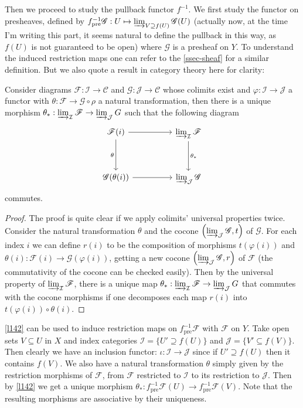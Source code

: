 \documentclass[12pt,letter]{article}
\begin{document}
	Then we proceed to study the pullback functor $f^{-1}$. We first study the functor on presheaves, defined by $f_{\text{pre}}^{-1}\mathscr G:U\mapsto \varinjlim_{V\supseteq f(U)}\mathscr G(U)$ (actually now, at the time I'm writing this part, it seems natural to define the pullback in this way, as $f(U)$ is not guaranteed to be open) where $\mathscr G$ is a presheaf on $Y$. To understand the induced restriction maps one can refer to the \autoref{ssec-sheaf} for a similar definition. But we also quote a result in category theory here for clarity:
	\begin{lemma}\label{l142}
		Consider diagrams $\mathscr F:\mathcal I\to \mathcal C$ and $\mathscr G:\mathcal J\to \mathcal C$ whose colimits exist and $\varphi:\mathcal I\to\mathcal J$ a functor with $\theta:\mathscr F\to \mathscr G\circ\rho$ a natural transformation, then there is a unique morphism $\theta_*:\varinjlim_{\mathcal I} \mathscr F\to\varinjlim_{\mathcal J}G$ such that the following diagram
		\[
			\begin{tikzcd}
				\mathscr F(i) \arrow[rr] \arrow[dd, "\theta"'] &  & \varinjlim_{\mathcal I}\mathscr F \arrow[dd, "\theta_*"] \\
															   &  &                                                          \\
				\mathscr{G}(\theta(i)) \arrow[rr]              &  & \varinjlim_{\mathcal J}\mathscr G                       
				\end{tikzcd}	
		\]
		commutes.
	\end{lemma}
	\begin{proof}
		The proof is quite clear if we apply colimits' universal properties twice. Consider the natural transformation $\theta$ and the cocone $\left(\varinjlim_{\mathcal J} \mathscr G, t\right)$ of $\mathscr G$. For each index $i$ we can define $r(i)$ to be the composition of morphisms $t(\varphi(i))$ and $\theta(i):\mathscr F(i)\to \mathscr G(\varphi(i))$, getting a new cocone $\left(\varinjlim_{\mathcal J}\mathscr  G, r\right)$ of $\mathscr F$ (the commutativity of the cocone can be checked easily). Then by the universal property of $\varinjlim_{\mathcal I} \mathscr F$, there is a unique map $\theta_*:\varinjlim_{\mathcal I} \mathscr F\to\varinjlim_{\mathcal J}G$ that commutes with the cocone morphisms if one decomposes each map $r(i)$ into $t(\varphi(i))\circ\theta(i)$.
	\end{proof}
	\autoref{l142} can be used to induce restriction maps on $f_{\mathrm{pre}}^{-1}\mathscr F$ with $\mathscr F$ on $Y$. Take open sets $V\subseteq U$ in $X$ and index categories $\mathcal I=\{U'\supseteq f(U)\}$ and $\mathcal J=\{V'\subseteq f(V)\}$. Then clearly we have an inclusion functor: $\iota:\mathcal I\to\mathcal J$ since if $U'\supseteq f(U)$ then it contains $f(V)$. We also have a natural transformation $\theta$ simply given by the restriction morphisms of $\mathscr F$, from $\mathscr F$ restricted to $\mathcal I$ to its restriction to $\mathcal J$. Then by \autoref{l142} we get a unique morphism $\theta_*:f_{\mathrm{pre}}^{-1}\mathscr F(U)\to f_{\mathrm{pre}}^{-1}\mathscr F(V)$. Note that the resulting morphisms are associative by their uniqueness.
\end{document}
